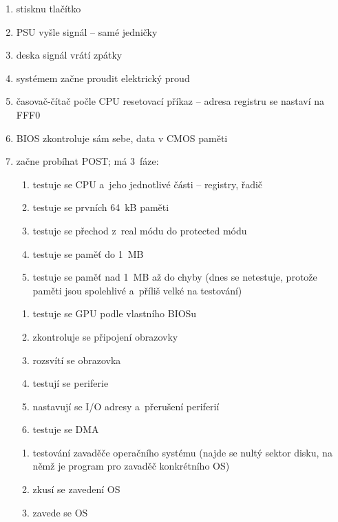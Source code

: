 \documentclass[a4paper,12pt]{article}
\newcommand*\circled[1]{\tikz[baseline=(char.base)]{
            \node[shape=circle,draw,inner sep=2pt] (char) {#1};}}
\providecommand{\tightlist}{%
\setlength{\itemsep}{0pt}\setlength{\parskip}{0pt}}
\begin{document}
\begin{enumerate}
  \tightlist
  \item stisknu tlačítko
  \item PSU vyšle signál -- samé jedničky
  \item deska signál vrátí zpátky
  \item systémem začne proudit elektrický proud
  \item časovač-čítač počle CPU resetovací příkaz -- adresa registru se nastaví na FFF0
  \item BIOS zkontroluje sám sebe, data v CMOS paměti
  \item začne probíhat POST; má 3~fáze:

  \circled{1}

  \begin{enumerate}[label=\arabic*)]
    \tightlist
    \item testuje se CPU a~jeho jednotlivé části -- registry, řadič
    \item testuje se prvních 64~kB paměti
    \item testuje se přechod z~real módu do protected módu
    \item testuje se paměť do 1~MB
    \item testuje se paměť nad 1~MB až do chyby (dnes se netestuje, protože
    paměti jsou spolehlivé a~příliš velké na testování)
  \end{enumerate}

  \circled{2}

  \begin{enumerate}[label=\arabic*)]
    \tightlist
    \item testuje se GPU podle vlastního BIOSu
    \item zkontroluje se připojení obrazovky
    \item rozsvítí se obrazovka
    \item testují se periferie
    \item nastavují se I/O adresy a~přerušení periferií
    \item testuje se DMA
  \end{enumerate}

  \circled{3}

  \begin{enumerate}[label=\arabic*)]
    \tightlist
    \item testování zavaděče operačního systému (najde se nultý sektor disku, na
    němž je program pro zavaděč konkrétního OS)
    \item zkusí se zavedení OS
    \item zavede se OS
  \end{enumerate}
\end{enumerate}
\end{document}

